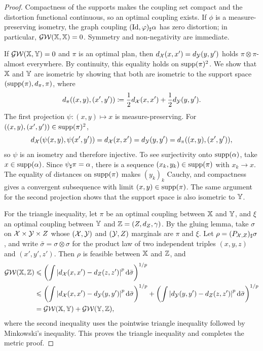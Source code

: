 \begin{proof}
	Compactness of the supports makes the coupling set compact and the distortion functional continuous, so an optimal coupling exists. If $\phi$ is a measure-preserving isometry, the graph coupling $(\mathrm{Id},\varphi)_\sharp\alpha$ has zero distortion; in particular, $\operatorname{\mathcal{GW}}(\mathbb{X},\mathbb{X})=0$. Symmetry and non-negativity are immediate.

	If $\operatorname{\mathcal{GW}}(\mathbb{X},\mathbb{Y})=0$ and $\pi$ is an optimal plan, then $d_{\mathcal{X}}(x,x')=d_{\mathcal{Y}}(y,y')$ holds $\pi\otimes\pi$-almost everywhere. By continuity, this equality holds on $\operatorname{supp}(\pi)^2$. We show that $\mathbb{X}$ and $\mathbb{Y}$ are isometric by showing that both are isometric to the support space $(\operatorname{supp}(\pi),d_\pi,\pi)$, where
	\[
		d_\pi((x,y),(x',y'))
		\coloneqq
		\frac12d_{\mathcal{X}}(x,x')+\frac12d_{\mathcal{Y}}(y,y').
	\]
	The first projection $\psi:(x,y)\mapsto x$ is measure-preserving. For $((x,y),(x',y'))\in\operatorname{supp}(\pi)^2$,
	\[
		d_{\mathcal{X}}(\psi(x,y),\psi(x',y'))
		=
		d_{\mathcal{X}}(x,x')
		=
		d_{\mathcal{Y}}(y,y')
		=
		d_\pi((x,y),(x',y')),
	\]
	so $\psi$ is an isometry and therefore injective. To see surjectivity onto $\operatorname{supp}(\alpha)$, take $x\in\operatorname{supp}(\alpha)$. Since $\psi_\sharp\pi=\alpha$, there is a sequence $(x_k,y_k)\in\operatorname{supp}(\pi)$ with $x_k\to x$. The equality of distances on $\operatorname{supp}(\pi)$ makes $(y_k)_k$ Cauchy, and compactness gives a convergent subsequence with limit $(x,y)\in\operatorname{supp}(\pi)$. The same argument for the second projection shows that the support space is also isometric to $\mathbb{Y}$.

	For the triangle inequality, let $\pi$ be an optimal coupling between $\mathbb{X}$ and $\mathbb{Y}$, and $\xi$ an optimal coupling between $\mathbb{Y}$ and $\mathbb{Z}=(Z,d_Z,\gamma)$. By the gluing lemma, take $\sigma$ on $\mathcal{X}\times\mathcal{Y}\times Z$ whose $(\mathcal{X},\mathcal{Y})$ and $(\mathcal{Y},Z)$ marginals are $\pi$ and $\xi$. Let $\rho=(P_{\mathcal{X},Z})_\sharp\sigma$, and write $\bar\sigma=\sigma\otimes\sigma$ for the product law of two independent triples $(x,y,z)$ and $(x',y',z')$. Then $\rho$ is feasible between $\mathbb{X}$ and $\mathbb{Z}$, and
	\begin{align*}
		\operatorname{\mathcal{GW}}(\mathbb{X},\mathbb{Z})
		&\leqslant
		\left(
		\int
		\left\lvert d_{\mathcal{X}}(x,x')-d_Z(z,z')\right\rvert^p
		\mathrm{d}\bar\sigma
		\right)^{1/p} \\
		&\leqslant
		\left(
		\int
		\left\lvert d_{\mathcal{X}}(x,x')-d_{\mathcal{Y}}(y,y')\right\rvert^p
		\mathrm{d}\bar\sigma
		\right)^{1/p}
		+
		\left(
		\int
		\left\lvert d_{\mathcal{Y}}(y,y')-d_Z(z,z')\right\rvert^p
		\mathrm{d}\bar\sigma
		\right)^{1/p} \\
		&=
		\operatorname{\mathcal{GW}}(\mathbb{X},\mathbb{Y})+\operatorname{\mathcal{GW}}(\mathbb{Y},\mathbb{Z}),
	\end{align*}
	where the second inequality uses the pointwise triangle inequality followed by Minkowski's inequality. This proves the triangle inequality and completes the metric proof.
\end{proof}

